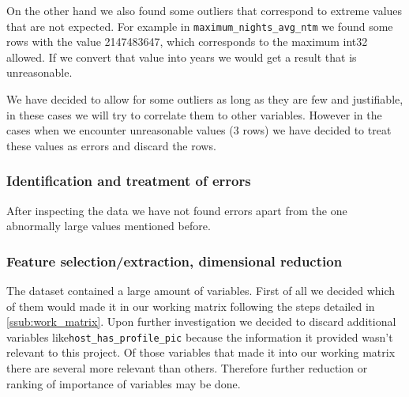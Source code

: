 On the other hand we also found some outliers that correspond to extreme values that are not
expected. For example in \texttt{maximum\_nights\_avg\_ntm} we found some rows with the value 2147483647,
which corresponds to the maximum int32 allowed. If we convert that value into years we would get a result 
that is unreasonable. 

We have decided to allow for some outliers as long as they are few and justifiable, in these cases we 
will try to correlate them to other variables. However in the cases when we encounter unreasonable 
values (3 rows) we have decided to treat these values as errors and discard the rows.

\subsubsection{Identification and treatment of errors}
After inspecting the data we have not found errors apart from the one abnormally large values 
mentioned before.

\subsubsection{Feature selection/extraction, dimensional reduction}
The \airbnb dataset contained a large amount of variables. First of all we decided which of them would made
it in our working matrix following the steps detailed in \ref{ssub:work_matrix}. Upon further investigation we decided 
to discard additional variables like\texttt{host\_has\_profile\_pic} because the information it provided 
wasn't relevant to this project. Of those variables that made it into our working matrix there are several 
more relevant than others. Therefore further reduction or ranking of importance of variables may be done.

\begin{comment}
\subsubsection{Instance selection}
In this preliminary report, we have not performed nor decided any instance selection steps.
\subsubsection{Data transformation}
\end{comment}

